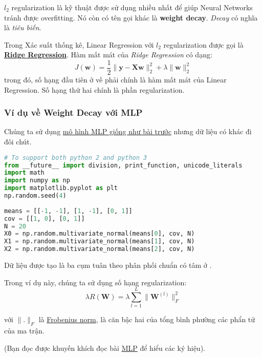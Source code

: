 $l_2$ regularization là kỹ thuật được sử dụng nhiều nhất để giúp Neural Networks tránh được overfitting. Nó còn có tên gọi khác là \textbf{weight decay}. \textit{Decay} có nghĩa là \textit{tiêu biến}. 
 
Trong Xác suất thống kê, Linear Regression với $l_2$ regularization được gọi là \href{https://en.wikipedia.org/wiki/Tikhonov_regularization}{\textbf{Ridge Regression}}. Hàm mất mát của \textit{Ridge Regression} có dạng: 
\begin{equation*} 
J(\mathbf{w}) = \frac{1}{2} \|\mathbf{y} - \mathbf{Xw}\|_2^2 + \lambda \|\mathbf{w}\|_2^2 
\end{equation*} 
trong đó, số hạng đầu tiên ở vế phải chính là hàm mất mát của Linear Regression. Số hạng thứ hai chính là phần regularization. 
 
 
\subsubsection{Ví dụ về Weight Decay với MLP}
Chúng ta sử dụng \href{http://machinelearningcoban.com/2017/02/24/mlp/#-vi-du-tren-python}{mô hình MLP giống như bài trước} nhưng dữ liệu có khác đi đôi chút. 
 
\begin{lstlisting}[language=Python]
# To support both python 2 and python 3 
from __future__ import division, print_function, unicode_literals 
import math 
import numpy as np 
import matplotlib.pyplot as plt 
np.random.seed(4) 
 
means = [[-1, -1], [1, -1], [0, 1]] 
cov = [[1, 0], [0, 1]] 
N = 20 
X0 = np.random.multivariate_normal(means[0], cov, N) 
X1 = np.random.multivariate_normal(means[1], cov, N) 
X2 = np.random.multivariate_normal(means[2], cov, N) 
\end{lstlisting}
Dữ liệu được tạo là ba cụm tuân theo phân phối chuẩn có tâm ở \pythoninline{[[-1, -1], [1, -1], [0, 1]]}. 
 
Trong ví dụ này, chúng ta sử dụng số hạng regularization: 
\begin{equation*} 
\lambda R(\mathbf{W}) = \lambda \sum_{l=1}^L \|\mathbf{W}^{(l)}\|_F^2 
\end{equation*} 
 
với $\|.\|_F$ là \href{http://machinelearningcoban.com/math/#cho-ma-tran}{Frobenius norm}, là căn bậc hai của tổng bình phường các phẩn tử của ma trận. 
 
(Bạn đọc được khuyến khích đọc bài \href{http://machinelearningcoban.com/2017/02/24/mlp/}{MLP} để hiểu các ký hiệu). 
 
